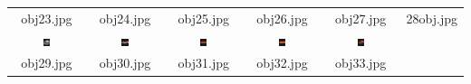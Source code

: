 \begin{table}[H]
\begin{tabu}{|cccccc|}
    \\
    \scriptsize{obj23.jpg} & \scriptsize{obj24.jpg} & \scriptsize{obj25.jpg} &
    \scriptsize{obj26.jpg} & \scriptsize{obj27.jpg} & \scriptsize{28obj.jpg}
    \\
    \includegraphics[width=0.1\textwidth,height=0.1\textwidth]{imagens/coil_100/carrinhos_brinquedos/obj37__0.png} &
    \includegraphics[width=0.1\textwidth,height=0.1\textwidth]{imagens/coil_100/carrinhos_brinquedos/obj69__0.png} &
    \includegraphics[width=0.1\textwidth,height=0.1\textwidth]{imagens/coil_100/carrinhos_brinquedos/obj76__0.png} &
    \includegraphics[width=0.1\textwidth,height=0.1\textwidth]{imagens/coil_100/carrinhos_brinquedos/obj91__0.png} &
    \includegraphics[width=0.1\textwidth,height=0.1\textwidth]{imagens/coil_100/carrinhos_brinquedos/obj100__0.png} &
    \\
    \scriptsize{obj29.jpg} & \scriptsize{obj30.jpg} & \scriptsize{obj31.jpg} &
    \scriptsize{obj32.jpg} & \scriptsize{obj33.jpg} &
  \end{tabu}
\end{table}

